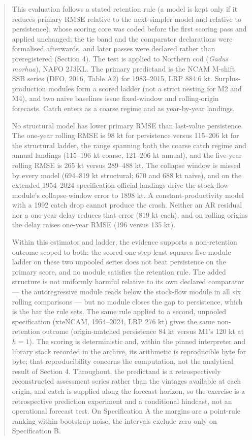 \documentclass[11pt]{article}
\begin{document}
\begin{abstract}


This evaluation follows a stated retention rule (a model is kept only if
it reduces primary RMSE relative to the next-simpler model and relative
to persistence), whose scoring core was coded before the first scoring
pass and applied unchanged; the tie band and the comparator declarations
were formalised afterwards, and later passes were declared rather than
preregistered (Section 4).
The test is applied to Northern cod (\emph{Gadus morhua}), NAFO 2J3KL.
The primary predictand is the NCAM M-shift SSB series (DFO, 2016, Table
A2) for 1983--2015, LRP 884.6 kt. Surplus-production modules form a
scored ladder (not a strict nesting for M2 and M4), and two naive
baselines issue fixed-window and rolling-origin forecasts. Catch enters
as a coarse regime and as year-by-year landings.

No structural model has lower primary RMSE than last-value persistence.
The one-year rolling RMSE is 98 kt for persistence versus 115--206 kt
for the structural ladder, the range spanning both the coarse catch
regime and annual landings (115--196 kt coarse, 121--206 kt annual), and
the five-year rolling RMSE is 265 kt versus 289--488 kt. The collapse window
is missed by every model (694--819 kt structural; 670 and 688 kt naive),
and on the extended 1954--2024 specification official landings drive the
stock-flow module's collapse-window error to 1898 kt. A
constant-productivity model with a 1992 catch drop cannot produce the
crash. Neither an AR residual nor a one-year delay reduces that error
(819 kt each), and on rolling origins the delay raises one-year RMSE
(196 versus 135 kt).

Within this estimator and ladder, the evidence supports a non-retention
outcome scoped to both: the scored one-step least-squares
five-module ladder on these two unpooled series does not beat
persistence on the primary score, and no module satisfies the retention
rule. The added structure is not uniformly harmful relative to its own
declared comparator --- the autoregressive module reads below the
stock-flow module in all six rolling comparisons --- but no module
closes the gap to persistence, which is the bar the rule sets. The same rule applied to a second, unpooled specification
(xteNCAM, 1954--2024, LRP 276 kt) gives the same non-retention outcome
(origin-matched persistence 84 kt versus M1's 120 kt at \(h=1\)). The
scoring is deterministic and, within the pinned interpreter and library
stack recorded in the archive, its arithmetic is reproducible byte for
byte;
that reproducibility concerns the computation, not the analytical result
of Section 4. Throughout, the
predictand is a retrospectively reconstructed assessment series rather
than the vintages available at each origin, and catch is supplied along
the forecast horizon, so the exercise is a retrospective prediction
experiment and a conditional hindcast, not an operational forecast test.
On Specification A the margins are a point-rule ranking within
bootstrap noise; the intervals exclude zero only on Specification B.

\end{abstract}
\end{document}
